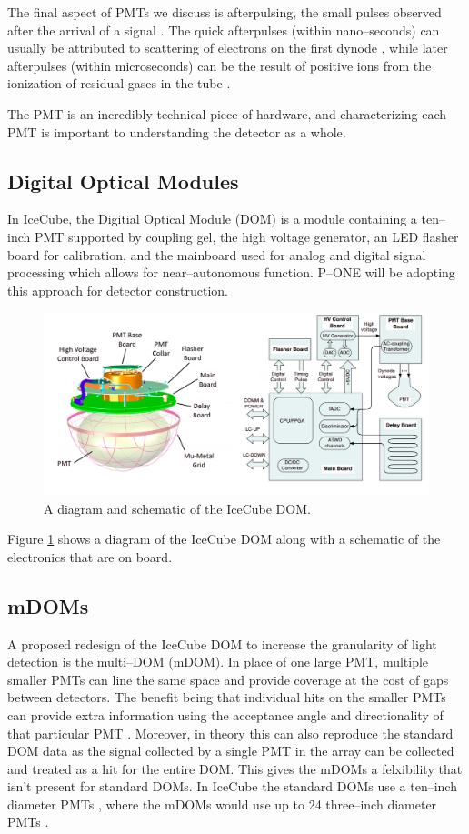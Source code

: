 The final aspect of PMTs we discuss is afterpulsing, the small pulses observed after the arrival of a signal \cite{ham}. The quick afterpulses (within nano--seconds) can usually be attributed to scattering of electrons on the first dynode \cite{ham}, while later afterpulses (within microseconds) can be the result of positive ions from the ionization of residual gases in the tube \cite{ham}.

The PMT is an incredibly technical piece of hardware, and characterizing each PMT is important to understanding the detector as a whole. 

\subsection{Digital Optical Modules}

In IceCube, the Digitial Optical Module (DOM) is a module containing a ten--inch PMT supported by coupling gel, the high voltage generator, an LED flasher board for calibration, and the mainboard used for analog and digital signal processing \cite{icecube_pmt,icecube} which allows for near--autonomous function. P--ONE will be adopting this approach for detector construction.

\begin{figure}[H]
  \centering
  \includegraphics[width=.9\textwidth]{./Figures/icecube_dom.png}
  \caption{A diagram and schematic of the IceCube DOM.}
  \label{fig:ice_dom}
\end{figure}

Figure \ref{fig:ice_dom} shows a diagram of the IceCube DOM along with a schematic of the electronics that are on board. 


\subsection{mDOMs}

A proposed redesign of the IceCube DOM to increase the granularity of light detection is the multi--DOM (mDOM). In place of one large PMT, multiple smaller PMTs can line the same space and provide coverage at the cost of gaps between detectors. The benefit being that individual hits on the smaller PMTs can provide extra information using the acceptance angle and directionality of that particular PMT \cite{mpmt}. Moreover, in theory this can also reproduce the standard DOM data as the signal collected by a single PMT in the array can be collected and treated as a hit for the entire DOM. This gives the mDOMs a felxibility that isn't present for standard DOMs. In IceCube the standard DOMs use a ten--inch diameter PMTs \cite{icecube}, where the mDOMs would use up to 24 three--inch diameter PMTs \cite{mpmt}.

